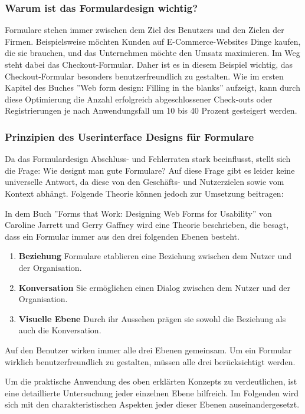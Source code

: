 \subsubsection{Warum ist das Formulardesign wichtig?}
Formulare stehen immer zwischen dem Ziel des Benutzers und den Zielen der Firmen. Beispielsweise möchten Kunden auf E-Commerce-Websites Dinge kaufen, die sie brauchen, und das Unternehmen möchte den Umsatz maximieren. Im Weg steht dabei das Checkout-Formular.
Daher ist es in diesem Beispiel wichtig, das Checkout-Formular besonders benutzerfreundlich zu gestalten. Wie im ersten Kapitel des Buches ''Web form design: Filling in the blanks'' \cite{wroblewski2008web} aufzeigt, kann durch diese Optimierung die Anzahl erfolgreich abgeschlossener Check-outs oder Registrierungen je nach Anwendungsfall um 10 bis 40 Prozent gesteigert werden.
 \cite{prompt4_pollak}

\subsubsection{Prinzipien des Userinterface Designs für Formulare}
Da das Formulardesign Abschluss- und Fehlerraten stark beeinflusst, stellt sich die Frage: Wie designt man gute Formulare? Auf diese Frage gibt es leider keine universelle Antwort, da diese von den Geschäfts- und Nutzerzielen sowie vom Kontext abhängt. Folgende Theorie können jedoch zur Umsetzung beitragen:

In dem Buch ''Forms that Work: Designing Web Forms for Usability'' \cite[S. 5-6]{jarrett2009forms} von Caroline Jarrett und Gerry Gaffney wird eine Theorie beschrieben, die besagt, dass ein Formular immer aus den drei folgenden Ebenen besteht.
\begin{enumerate}
    \item \textbf{Beziehung} Formulare etablieren eine Beziehung zwischen dem Nutzer und der Organisation.
    
    \item \textbf{Konversation} Sie ermöglichen einen Dialog zwischen dem Nutzer und der Organisation.
    
    \item \textbf{Visuelle Ebene} Durch ihr Aussehen prägen sie sowohl die Beziehung als auch die Konversation.
\end{enumerate}
Auf den Benutzer wirken immer alle drei Ebenen gemeinsam. Um ein Formular wirklich benutzerfreundlich zu gestalten, müssen alle drei berücksichtigt werden.

Um die praktische Anwendung des oben erklärten Konzepts zu verdeutlichen, ist eine detaillierte Untersuchung jeder einzelnen Ebene hilfreich. Im Folgenden wird sich mit den charakteristischen Aspekten jeder dieser Ebenen auseinandergesetzt. \cite{prompt5_pollak}

